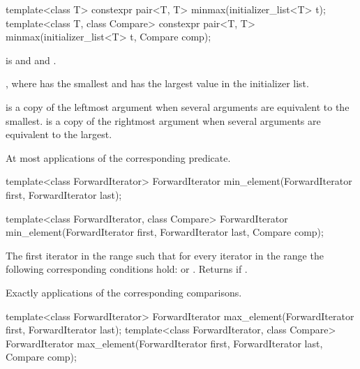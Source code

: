 %
\begin{itemdecl}
template<class T>
  constexpr pair<T, T> minmax(initializer_list<T> t);
template<class T, class Compare>
  constexpr pair<T, T> minmax(initializer_list<T> t, Compare comp);
\end{itemdecl}

\begin{itemdescr}
\pnum
\requires {} is  and  and .

\pnum
\returns {}, where  has the smallest and  has the
largest value in the initializer list.

\pnum
\remarks {} is a copy of the leftmost argument when several arguments are equivalent to
the smallest.  is a copy of the rightmost argument when several arguments are
equivalent to the largest.

\pnum
\complexity At most  applications of the corresponding predicate.
\end{itemdescr}

%
\begin{itemdecl}
template<class ForwardIterator>
  ForwardIterator min_element(ForwardIterator first, ForwardIterator last);

template<class ForwardIterator, class Compare>
  ForwardIterator min_element(ForwardIterator first, ForwardIterator last,
                            Compare comp);
\end{itemdecl}

\begin{itemdescr}
\pnum
\returns
The first iterator
in the range
such that for every iterator
in the range
the following corresponding conditions hold:
or
.
Returns
if
.

\pnum
\complexity
Exactly
applications of the corresponding comparisons.
\end{itemdescr}

%
\begin{itemdecl}
template<class ForwardIterator>
  ForwardIterator max_element(ForwardIterator first, ForwardIterator last);
template<class ForwardIterator, class Compare>
  ForwardIterator max_element(ForwardIterator first, ForwardIterator last,
                            Compare comp);
\end{itemdecl}

